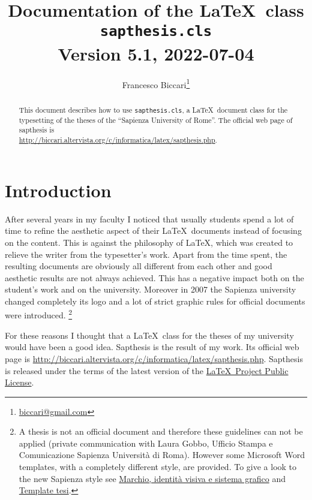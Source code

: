 \documentclass[a5paper,11pt]{article}
\author{\small Francesco Biccari\thanks{\href{mailto:biccari@gmail.com}{biccari@gmail.com}}}
\title{\small Documentation of the \LaTeX\ class\\
		\Large \textbf{\texttt{sapthesis.cls}}\\
		\small \vspace{0.2cm} Version 5.1, 2022-07-04
}
\date{}
\begin{document}
\maketitle

\begin{abstract}\noindent
This document describes how to use \texttt{sapthesis.cls}, a \LaTeX\ document class for the typesetting of the theses of the ``Sapienza University of Rome''. The official web page of \textsf{sapthesis} is\\
{\footnotesize\url{http://biccari.altervista.org/c/informatica/latex/sapthesis.php}}.
\end{abstract}

\setcounter{tocdepth}{2}
\renewcommand{\columnseprule}{0.4pt}
\setlength{\columnsep}{1.5cm}

{\small
\tableofcontents}

\clearpage

\section{Introduction}

After several years in my faculty I noticed that usually students spend a lot of time to refine the aesthetic aspect of their \LaTeX\ documents instead of focusing on the content.
This is against the philosophy of \LaTeX, which was created to relieve the writer from the typesetter's work.
Apart from the time spent, the resulting documents are obviously all different from each other and good aesthetic results are not always achieved.
This has a negative impact both on the student's work and on the university.
Moreover in 2007 the Sapienza university changed completely its
logo and a lot of strict graphic rules for official documents were introduced.%
\footnote{A thesis is not an official document and therefore these guidelines can not be applied (private communication with Laura Gobbo, Ufficio Stampa e Comunicazione Sapienza  Universit\`a di Roma).
However some Microsoft Word templates, with a completely different style, are provided.
To give a look to the new Sapienza style see 
\href{https://www.uniroma1.it/it/pagina/marchio-identita-visiva-e-sistema-grafico}{Marchio, identità visiva e sistema grafico} and \href{https://www.uniroma1.it/it/pagina/impaginazione-della-tesi-e-logo}{Template tesi}.}

For these reasons I thought that a \LaTeX\ class for the theses of my 
university would have been a good idea.
\textsf{Sapthesis} is the result of my work.
Its official web page is
{\footnotesize\url{http://biccari.altervista.org/c/informatica/latex/sapthesis.php}}.
\textsf{Sapthesis} is released under the terms of the latest version of the 
\href{http://www.latex-project.org/lppl/}{\LaTeX\ Project Public License}.
\end{document}
